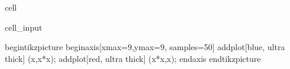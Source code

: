 \documentclass[letterpaper,10pt,english]{jupyterBook}
\begin{document}
\begin{sphinxuseclass}{cell}\begin{sphinxVerbatimInput}

\begin{sphinxuseclass}{cell_input}
\begin{sphinxVerbatim}[commandchars=\\\{\}]
\PYGZbs{}begin\PYGZob{}tikzpicture\PYGZcb{}
\PYGZbs{}begin\PYGZob{}axis\PYGZcb{}[xmax=9,ymax=9, samples=50]
  \PYGZbs{}addplot[blue, ultra thick] (x,x*x);
  \PYGZbs{}addplot[red,  ultra thick] (x*x,x);
\PYGZbs{}end\PYGZob{}axis\PYGZcb{}
\PYGZbs{}end\PYGZob{}tikzpicture\PYGZcb{}
\end{sphinxVerbatim}

\end{sphinxuseclass}\end{sphinxVerbatimInput}
\begin{sphinxVerbatimOutput}


\end{sphinxVerbatimOutput}
\end{sphinxuseclass}
\end{document}
